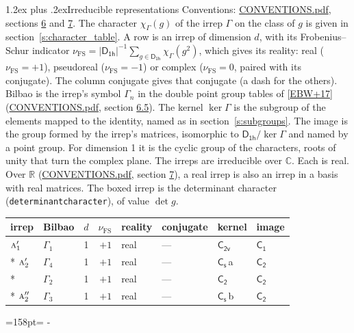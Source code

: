 \documentclass[10pt,a4paper]{article}
\makeatletter
\renewcommand\section{\@startsection{section}{1}{\z@}{-3ex plus -1ex minus -.2ex}%
  {1.2ex plus .2ex}{\normalfont\large\sffamily\bfseries\color{parttitle}}}
\newcommand{\needspace}[1]{\par\penalty-100\begingroup\dimen0=#1\relax\dimen2=\pagegoal
  \advance\dimen2-\pagetotal\ifdim\dimen0>\dimen2\relax\ifdim\dimen2>0pt\vfil\break\fi\fi
  \endgroup}
\numberwithin{equation}{section}
\newcommand{\grp}[1]{\mathsf{#1}}
\newcommand{\irr}[1]{\text{\normalfont\scshape #1}}
\newcommand{\detbox}[1]{{\setlength{\fboxsep}{1pt}\fbox{#1}}}
\newcommand{\clsletter}[1]{\,{\scriptsize\color{black!55}#1}}
\newcommand{\irchar}[1]{\chi_{#1}}
\newcommand{\fsind}{\nu_{\mathrm{FS}}}
\makeatother
\begin{document}
\section{Irreducible representations}\label{s:irreps}
Conventions: \href{../../CONVENTIONS.pdf}{CONVENTIONS.pdf}, sections \href{../../CONVENTIONS.pdf\#conv.6}{6} and \href{../../CONVENTIONS.pdf\#conv.7}{7}.
\leavevmode\label{n:function.character}\label{n:irrep.Gamma}The character $\irchar{\Gamma}(g)$ of the irrep $\Gamma$ on the class of $g$ is given in section~\ref{s:character_table}.
\leavevmode\label{n:index.dimension}\label{n:index.frobenius}\label{n:head.irrep}\label{n:head.reality}A row is an irrep of dimension $d$, with its Frobenius--Schur indicator $\fsind = |\grp{D_{1h}}|^{-1}\allowbreak\sum_{g\in\grp{D_{1h}}}\irchar{\Gamma}(g^2)$, which gives its reality: real ($\fsind = +1$), pseudoreal ($\fsind = -1$) or complex ($\fsind = 0$, paired with its conjugate). \label{n:head.conjugate}The column conjugate gives that conjugate (a dash for the others). \label{n:head.bilbao}\label{n:irrep.alias.gamma}Bilbao is the irrep's symbol $\Gamma_n$ in the double point group tables of [\href{../../../REFERENCES.pdf\#ref.EBW+17}{EBW+17}] (\href{../../CONVENTIONS.pdf}{CONVENTIONS.pdf}, section \href{../../CONVENTIONS.pdf\#conv.6.5}{6.5}). \label{n:head.kernel}The kernel $\ker\Gamma$ is the subgroup of the elements mapped to the identity, named as in section~\ref{s:subgroups}. \label{n:head.image}The image is the group formed by the irrep's matrices, isomorphic to $\grp{D_{1h}}/\ker\Gamma$ and named by a point group. For dimension 1 it is the cyclic group of the characters, roots of unity that turn the complex plane. The irreps are irreducible over $\mathbb{C}$. Each is real. Over $\mathbb{R}$ (\href{../../CONVENTIONS.pdf}{CONVENTIONS.pdf}, section \href{../../CONVENTIONS.pdf\#conv.7}{7}), a real irrep is also an irrep in a basis with real matrices. \label{n:mark.determinant}The boxed irrep is the determinant character (\texttt{determinantcharacter}), of value $\det g$.
\setlength{\emergencystretch}{2em}\par\setlength{\emergencystretch}{0pt}
{\small\renewcommand{\arraystretch}{1.25}\begin{longtable}{@{}llrrllll@{}}\toprule
irrep & Bilbao & $d$ & $\fsind$ & reality & conjugate & kernel & image\\\midrule\endhead
\bottomrule\endfoot\endlastfoot
$\irr{a}_{1}'$ & $\Gamma_{1}$ & 1 & $+1$ & real & --- & \href{C2v.pdf}{$\grp{C_{2v}}$} & \href{C1.pdf}{$\grp{C_{1}}$}\\*
$\irr{a}_{2}'$ & $\Gamma_{4}$ & 1 & $+1$ & real & --- & \href{C1v.pdf}{$\grp{C_{s}}$}\clsletter{a} & \href{C2.pdf}{$\grp{C_{2}}$}\\*
\detbox{$\irr{a}_{1}''$} & $\Gamma_{2}$ & 1 & $+1$ & real & --- & \href{C2.pdf}{$\grp{C_{2}}$} & \href{C2.pdf}{$\grp{C_{2}}$}\\*
$\irr{a}_{2}''$ & $\Gamma_{3}$ & 1 & $+1$ & real & --- & \href{C1v.pdf}{$\grp{C_{s}}$}\clsletter{b} & \href{C2.pdf}{$\grp{C_{2}}$}\\
\bottomrule\end{longtable}}
\needspace{158pt}
\end{document}
